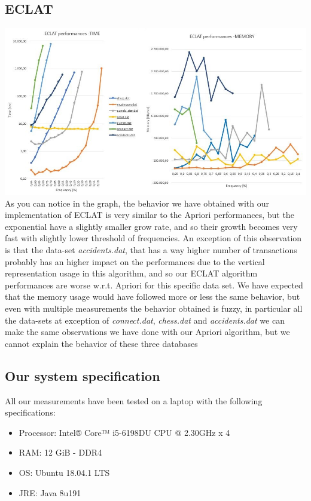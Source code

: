 \documentclass[11pt, a4paper]{article}
\begin{document}
		\subsection{ECLAT}
			\includegraphics[scale =0.6]{ECLAT.JPG}
			\newline
			As you can notice in the graph, the behavior we have obtained with our implementation of ECLAT is very similar to the Apriori performances, but the exponential have a slightly smaller grow rate, and so their growth becomes very fast with slightly lower threshold of frequencies.
			An exception of this observation is that the data-set \textit{accidents.dat}, that has a way higher number of transactions probably has an higher impact on the performances due to the vertical representation usage in this algorithm, and so our ECLAT algorithm performances are worse w.r.t. Apriori for this specific data set.
			We have expected that the memory usage would have followed more or less the same behavior, but even with multiple measurements the behavior obtained is fuzzy, in particular all the data-sets at exception of \textit{connect.dat}, \textit{chess.dat} and \textit{accidents.dat}  we can make the same observations we have done with our Apriori algorithm, but we cannot explain the behavior of these three databases
			
			\noindent
		\subsection{Our system specification}
			All our measurements have been tested on a laptop with the following specifications:
			\begin{multicols}{2}
				\begin{itemize}
					\item Processor: Intel® Core™ i5-6198DU CPU @ 2.30GHz x 4 
					\item RAM: 12 GiB - DDR4
					\item OS: Ubuntu 18.04.1 LTS
					\item JRE: Java 8u191
				\end{itemize}
			\end{multicols}
			
\end{document}
